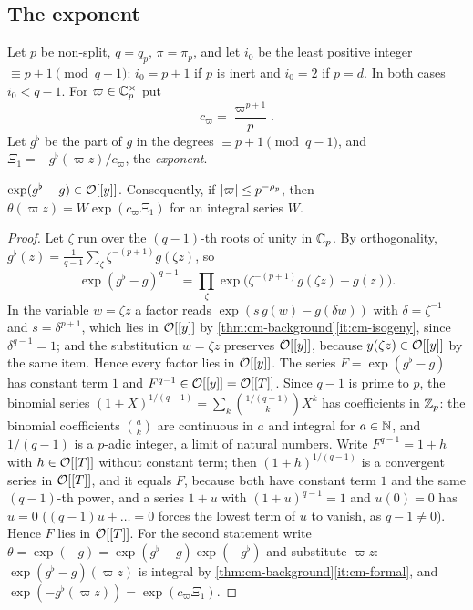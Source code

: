 \subsection{The exponent}\label{ss:exponent}
Let $p$ be non-split, $q=q_p$, $\pi=\pi_p$, and let $i_0$ be the least positive integer
$\equiv p+1\pmod{q-1}$: $i_0=p+1$ if $p$ is inert and $i_0=2$ if $p=d$. In both cases $i_0<q-1$.
For $\varpi\in\mathbb{C}_p^\times$ put
\[
  c_\varpi=\frac{\varpi^{p+1}}p .
\]
Let $g^\flat$ be the part of $g$ in the degrees $\equiv p+1\pmod{q-1}$, and
$\Xi_1=-g^\flat(\varpi z)/c_\varpi$, the \emph{exponent}.

\begin{lemma}[Averaging]\label{lem:averaging}
$\exp(g^\flat-g)\in\mathcal{O}[[y]]$. Consequently, if $\lvert \varpi\rvert\le p^{-\rho_p}$, then
$\theta(\varpi z)=W\exp(c_\varpi\Xi_1)$ for an integral series $W$.
\end{lemma}

\begin{proof}
Let $\zeta$ run over the $(q-1)$-th roots of unity in $\mathbb{C}_p$. By orthogonality,
$g^\flat(z)=\frac1{q-1}\sum_\zeta\zeta^{-(p+1)}g(\zeta z)$, so
\[
  \exp(g^\flat-g)^{q-1}=\prod_\zeta\exp\bigl(\zeta^{-(p+1)}g(\zeta z)-g(z)\bigr).
\]
In the variable $w=\zeta z$ a factor reads $\exp(s\,g(w)-g(\delta w))$ with $\delta=\zeta^{-1}$ and
$s=\delta^{p+1}$, which lies in $\mathcal{O}[[y]]$ by \cref{thm:cm-background}\ref{it:cm-isogeny}, since
$\delta^{q-1}=1$; and the substitution $w=\zeta z$ preserves $\mathcal{O}[[y]]$, because $y(\zeta z)\in
\mathcal{O}[[y]]$ by the same item. Hence every factor lies in $\mathcal{O}[[y]]$. The series
$F=\exp(g^\flat-g)$ has constant term $1$ and $F^{q-1}\in\mathcal{O}[[y]]=\mathcal{O}[[T]]$. Since $q-1$ is prime to
$p$, the binomial series $(1+X)^{1/(q-1)}=\sum_k\binom{1/(q-1)}kX^k$ has coefficients in $\mathbb{Z}_p$: the binomial coefficients $\binom ak$ are continuous in $a$ and integral for $a\in\mathbb{N}$, and $1/(q-1)$ is a $p$-adic integer, a limit of natural numbers. Write $F^{q-1}=1+h$ with $h\in\mathcal{O}[[T]]$ without constant term; then $(1+h)^{1/(q-1)}$ is a convergent series in $\mathcal{O}[[T]]$, and it equals $F$, because both have constant term $1$ and the same $(q-1)$-th power, and a series $1+u$ with $(1+u)^{q-1}=1$ and $u(0)=0$ has $u=0$ ($(q-1)u+\dots=0$ forces the lowest term of $u$ to vanish, as $q-1\ne0$). Hence $F$
lies in $\mathcal{O}[[T]]$. For the second statement write $\theta=\exp(-g)=\exp(g^\flat-g)\exp(-g^\flat)$ and
substitute $\varpi z$: $\exp(g^\flat-g)(\varpi z)$ is integral by
\cref{thm:cm-background}\ref{it:cm-formal}, and $\exp(-g^\flat(\varpi z))=\exp(c_\varpi\Xi_1)$.
\end{proof}

